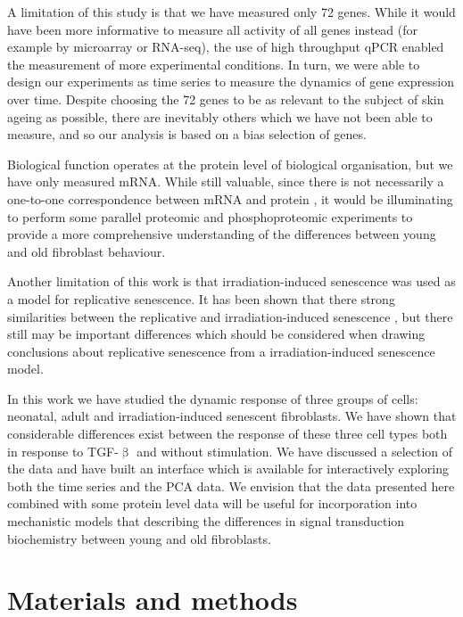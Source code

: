 \documentclass[alpha-refs]{wiley-article}
\newcommand{\tgf}{TGF-$\upbeta$}
\begin{document}
A limitation of this study is that we have measured only 72 genes. While it would have been more informative to measure all activity of all genes instead (for example by microarray or RNA-seq), the use of high throughput qPCR enabled the measurement of more experimental conditions. In turn, we were able to design our experiments as time series to measure the dynamics of gene expression over time. Despite choosing the 72 genes to be as relevant to the subject of skin ageing as possible, there are inevitably others which we have not been able to measure, and so our analysis is based on a bias selection of genes. 

Biological function operates at the protein level of biological organisation, but we have only measured mRNA. While still valuable, since there is not necessarily a one-to-one correspondence between mRNA and protein \citep{Liu2016}, it would be illuminating to perform some parallel proteomic and phosphoproteomic experiments to provide a more comprehensive understanding of the differences between young and old fibroblast behaviour.

Another limitation of this work is that irradiation-induced senescence was used as a model for replicative senescence. It has been shown that there strong similarities between the replicative and irradiation-induced senescence \citep{Marthandan2016}, but there still may be important differences which should be considered when drawing conclusions about replicative senescence from a irradiation-induced senescence model. 

In this work we have studied the dynamic response of three groups of cells: neonatal, adult and irradiation-induced senescent fibroblasts. We have shown that considerable differences exist between the response of these three cell types both in response to \tgf{} and without stimulation. We have discussed a selection of the data and have built an interface which is available for interactively exploring both the time series and the PCA data. We envision that the data presented here combined with some protein level data will be useful for incorporation into mechanistic models that describing the differences in signal transduction biochemistry between young and old fibroblasts.

\section{Materials and methods}
\end{document}
